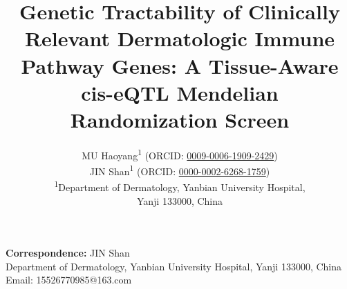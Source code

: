 \documentclass[12pt,a4paper]{article}
\title{Genetic Tractability of Clinically Relevant Dermatologic Immune Pathway Genes: A Tissue-Aware cis-eQTL Mendelian Randomization Screen}
\author{MU Haoyang\textsuperscript{1} (ORCID: \href{https://orcid.org/0009-0006-1909-2429}{0009-0006-1909-2429}) \\
JIN Shan\textsuperscript{1} (ORCID: \href{https://orcid.org/0000-0002-6268-1759}{0000-0002-6268-1759}) \\
\textsuperscript{1}Department of Dermatology, Yanbian University Hospital, \\
Yanji 133000, China}
\date{}
\begin{document}
\maketitle

\noindent\textbf{Correspondence:} JIN Shan \\
Department of Dermatology, Yanbian University Hospital, Yanji 133000, China \\
Email: 15526770985@163.com















\end{document}
